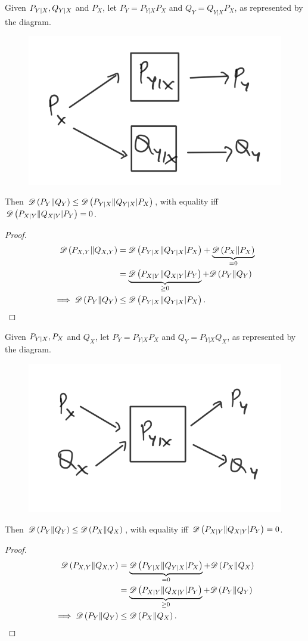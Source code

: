 \documentclass[11pt,a4paper]{article}
\begin{document}
\begin{theorem}
    Given $P_{Y|X}, Q_{Y|X}$ and $P_X$, let $P_Y = P_{Y|X} P_X$ and $Q_Y = Q_{Y|X}P_X$, as represented by the diagram. 
    \begin{figure}[ht]
        \centering
        \includegraphics[width=0.3\linewidth]{images/Conditional_Divergence.png}
    \end{figure}

    \noindent Then $\mathscr{D} \left(P_Y\|Q_Y\right)\le \mathscr{D} \left(P_{Y|X}\|Q_{Y|X} |P_X\right)$, with equality iff $\mathscr{D} \left(P_{X|Y}\|Q_{X|Y} |P_Y\right) = 0$.  
\end{theorem}

\begin{proof}
\begin{align*}
    \mathscr{D} \left(P_{X,Y}\|Q_{X,Y}\right)  &= \mathscr{D} \left(P_{Y|X}\|Q_{Y|X} |P_X\right) +  \underbrace{\mathscr{D} \left(P_X\|P_X\right)}_{ = 0} \\
        &= \underbrace{\mathscr{D} \left(P_{X|Y}\|Q_{X|Y} |P_Y\right)}_{\geq 0}  + \mathscr{D} \left(P_Y\|Q_Y\right)\\
    \implies \mathscr{D} \left(P_Y\|Q_Y\right) &\le \mathscr{D} \left(P_{Y|X}\|Q_{Y|X} |P_X\right).
\end{align*}
\end{proof}

\begin{theorem}
    Given $P_{Y|X}, P_X$ and $Q_X$, let $P_Y = P_{Y|X} P_X$ and $Q_Y = P_{Y|X}Q_X$, as represented by the diagram. 
    \begin{figure}[ht]
        \centering
        \includegraphics[width=0.3\linewidth]{images/DPI_Divergence.png}
    \end{figure}

    \noindent Then $\mathscr{D} \left(P_Y\|Q_Y\right)\le \mathscr{D} \left(P_X\|Q_X\right)$, with equality iff $\mathscr{D} \left(P_{X|Y}\|Q_{X|Y} |P_Y\right) = 0$.
\end{theorem}

\begin{proof}
    \begin{align*}
        \mathscr{D} \left(P_{X,Y}\|Q_{X,Y}\right)  &= \underbrace{\mathscr{D} \left(P_{Y|X}\|Q_{Y|X} |P_X\right)}_{=0} +  \mathscr{D} \left(P_X\|Q_X\right) \\
            &= \underbrace{\mathscr{D} \left(P_{X|Y}\|Q_{X|Y} |P_Y\right)}_{\geq 0}  + \mathscr{D} \left(P_Y\|Q_Y\right)\\
        \implies \mathscr{D} \left(P_Y\|Q_Y\right) &\le \mathscr{D} \left(P_X\|Q_X\right).
    \end{align*}    
\end{proof}
\end{document}
